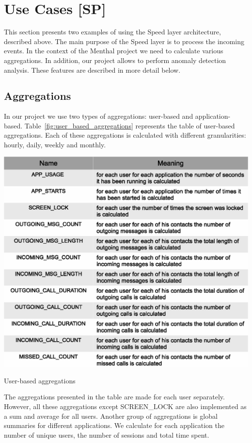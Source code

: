 \section{Use Cases [SP]}
\label{sec:use_cases}

This section presents two examples of using the Speed layer architecture, described above.
The main purpose of the Speed layer is to process the incoming events.
In the context of the Menthal project we need to calculate various aggregations.
In addition, our project allows to perform anomaly detection analysis.
These features are described in more detail below.

\subsection{Aggregations}

In our project we use two types of aggregations: user-based and application-based.
Table~\ref{fig:user_based_aggregations} represents the table of user-based aggregations.
Each of these aggregations is calculated with different granularities: hourly, daily, weekly and monthly.

\begin{table}
  \centering
  \includegraphics [width=1.0\textwidth]{images/user_based_aggregations}
  \caption{User-based aggregations}
  \label{fig:user_based_aggregations}
\end{table}

The aggregations presented in the table are made for each user separately.
However, all these aggregations except SCREEN\_LOCK are also implemented as a sum and average for all users. 
Another group of aggregations is global summaries for different applications.
We calculate for each application the number of unique users, the number of sessions and total time spent. 

